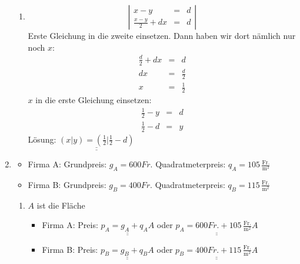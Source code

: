\documentclass[%
11pt,%
twoside,%
titlepage,%
german,%
]{scrartcl}
\newcommand{\ufrac}[2]{\ensuremath{\,\frac{\mathrm{#1}}{\mathrm{#2}}}}
\newcommand{\result}[1]{\underline{\underline{#1}}}
\begin{document}
\begin{enumerate}
\begin{enumerate}
  \item 
    \begin{displaymath}
      \left| 
        \begin{array}{rcl}
         x-y & = & d \\
         \frac{x-y}{2}+dx & = & d
        \end{array} \right|
    \end{displaymath}
    Erste Gleichung in die zweite einsetzen. Dann haben wir dort n\"amlich nur noch $x$:
    \begin{eqnarray*}
      \frac{d}{2} + dx & = & d \\
      dx & = & \frac{d}{2} \\
      x & = & \frac{1}{2}
    \end{eqnarray*}
    $x$ in die erste Gleichung einsetzen:
    \begin{eqnarray*}
      \frac{1}{2}-y & = & d \\
      \frac{1}{2}-d & = & y
    \end{eqnarray*}
    L\"osung: $\result{(x|y)=(\frac{1}{2}|\frac{1}{2}-d)}$

  \end{enumerate}

\item 
  \begin{itemize}
  \item Firma A: Grundpreis: $g_A=600\unit{Fr.}$ \qquad Quadratmeterpreis: $q_A=105\ufrac{Fr.}{m^2}$
  \item Firma B: Grundpreis: $g_B=400\unit{Fr.}$ \qquad Quadratmeterpreis: $q_B=115\ufrac{Fr.}{m^2}$
  \end{itemize}
    \begin{enumerate}
    \item $A$ ist die Fl\"ache
      \begin{itemize}
      \item Firma A: Preis: $\result{p_A=g_A + q_A A}$ oder $\result{p_A=600\unit{Fr.} + 105\ufrac{Fr.}{m^2} A}$
      \item Firma B: Preis: $\result{p_B=g_B + q_B A}$ oder $\result{p_B=400\unit{Fr.} + 115\ufrac{Fr.}{m^2} A}$
      \end{itemize}


\end{enumerate}
\end{enumerate}
\end{document}
